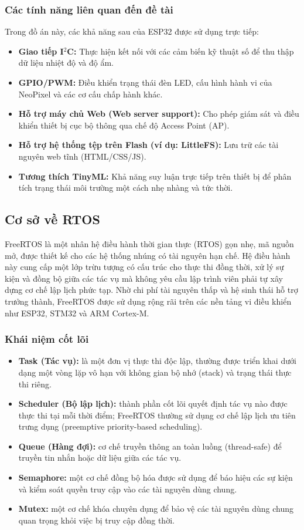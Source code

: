 \subsubsection{Các tính năng liên quan đến đề tài}
Trong đồ án này, các khả năng sau của ESP32 được sử dụng trực tiếp:
\begin{itemize}
    \item \textbf{Giao tiếp I$^2$C:} Thực hiện kết nối với các cảm biến kỹ thuật số để thu thập dữ liệu nhiệt độ và độ ẩm.
    \item \textbf{GPIO/PWM:} Điều khiển trạng thái đèn LED, cấu hình hành vi của NeoPixel và các cơ cấu chấp hành khác.
    \item \textbf{Hỗ trợ máy chủ Web (Web server support):} Cho phép giám sát và điều khiển thiết bị cục bộ thông qua chế độ Access Point (AP).
    \item \textbf{Hỗ trợ hệ thống tệp trên Flash (ví dụ: LittleFS):} Lưu trữ các tài nguyên web tĩnh (HTML/CSS/JS).
    \item \textbf{Tương thích TinyML:} Khả năng suy luận trực tiếp trên thiết bị để phân tích trạng thái môi trường một cách nhẹ nhàng và tức thời.
\end{itemize}


\subsection{Cơ sở về RTOS}
FreeRTOS là một nhân hệ điều hành thời gian thực (RTOS) gọn nhẹ, mã nguồn mở, được thiết kế cho các hệ thống nhúng có tài nguyên hạn chế. Hệ điều hành này cung cấp một lớp trừu tượng có cấu trúc cho thực thi đồng thời, xử lý sự kiện và đồng bộ giữa các tác vụ mà không yêu cầu lập trình viên phải tự xây dựng cơ chế lập lịch phức tạp. Nhờ chi phí tài nguyên thấp và hệ sinh thái hỗ trợ trưởng thành, FreeRTOS được sử dụng rộng rãi trên các nền tảng vi điều khiển như ESP32, STM32 và ARM Cortex-M.

\subsubsection{Khái niệm cốt lõi}
\begin{itemize}
	\item \textbf{Task (Tác vụ):} là một đơn vị thực thi độc lập, thường được triển khai dưới dạng một vòng lặp vô hạn với không gian bộ nhớ (stack) và trạng thái thực thi riêng.
	\item \textbf{Scheduler (Bộ lập lịch):} thành phần cốt lõi quyết định tác vụ nào được thực thi tại mỗi thời điểm; FreeRTOS thường sử dụng cơ chế lập lịch ưu tiên trưng dụng (preemptive priority-based scheduling).
	\item \textbf{Queue (Hàng đợi):} cơ chế truyền thông an toàn luồng (thread-safe) để truyền tin nhắn hoặc dữ liệu giữa các tác vụ.
	\item \textbf{Semaphore:} một cơ chế đồng bộ hóa được sử dụng để báo hiệu các sự kiện và kiểm soát quyền truy cập vào các tài nguyên dùng chung.
	\item \textbf{Mutex:} một cơ chế khóa chuyên dụng để bảo vệ các tài nguyên dùng chung quan trọng khỏi việc bị truy cập đồng thời.
\end{itemize}


